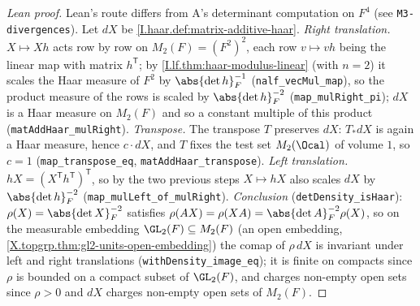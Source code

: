 \begin{proof}[Lean proof]
Lean's route differs from A's determinant computation on $F^4$ (see \texttt{M3-divergences}). Let $dX$ be \cref{I.haar.def:matrix-additive-haar}. \emph{Right translation.} $X\mapsto Xh$ acts row by row on $M_2(F)=(F^2)^2$, each row $v\mapsto vh$ being the linear map with matrix $h^{\mathsf T}$; by \cref{I.lf.thm:haar-modulus-linear} (with $n=2$) it scales the Haar measure of $F^2$ by $\abs{\det h}_F^{-1}$ (\texttt{nalf\_vecMul\_map}), so the product measure of the rows is scaled by $\abs{\det h}_F^{-2}$ (\texttt{map\_mulRight\_pi}); $dX$ is a Haar measure on $M_2(F)$ and so a constant multiple of this product (\texttt{matAddHaar\_mulRight}). \emph{Transpose.} The transpose $T$ preserves $dX$: $T_*dX$ is again a Haar measure, hence $c\cdot dX$, and $T$ fixes the test set $M_2(\Ocal)$ of volume $1$, so $c=1$ (\texttt{map\_transpose\_eq}, \texttt{matAddHaar\_transpose}). \emph{Left translation.} $hX=(X^{\mathsf T}h^{\mathsf T})^{\mathsf T}$, so by the two previous steps $X\mapsto hX$ also scales $dX$ by $\abs{\det h}_F^{-2}$ (\texttt{map\_mulLeft\_of\_mulRight}). \emph{Conclusion} (\texttt{detDensity\_isHaar}): $\rho(X)=\abs{\det X}_F^{-2}$ satisfies $\rho(AX)=\rho(XA)=\abs{\det A}_F^{-2}\rho(X)$, so on the measurable embedding $\GL_2(F)\subseteq M_2(F)$ (an open embedding, \cref{X.topgrp.thm:gl2-units-open-embedding}) the comap of $\rho\,dX$ is invariant under left and right translations (\texttt{withDensity\_image\_eq}); it is finite on compacts since $\rho$ is bounded on a compact subset of $\GL_2(F)$, and charges non-empty open sets since $\rho>0$ and $dX$ charges non-empty open sets of $M_2(F)$.
\end{proof}

